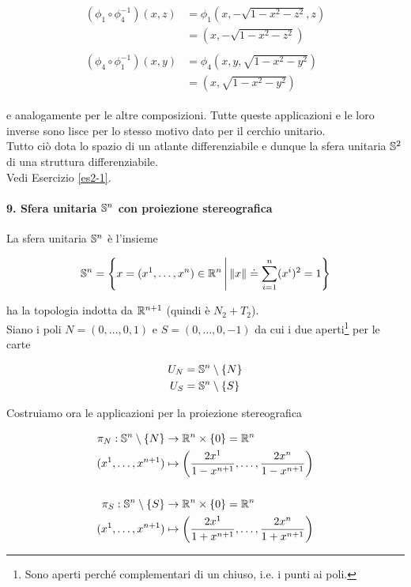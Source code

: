 \begin{align}
	\begin{split}
		(\phi_{1} \circ \phi_{4}^{-1})(x,z) &= \phi_{1} \left( x,-\sqrt{1-x^{2}-z^{2}},z \right)\\
		&= \left( x,-\sqrt{1-x^{2}-z^{2}} \right)\\\\
		(\phi_{4} \circ \phi_{1}^{-1})(x,y) &= \phi_{4} \left( x,y,\sqrt{1-x^{2}-y^{2}} \right)\\
		&= \left( x,\sqrt{1-x^{2}-y^{2}} \right)
	\end{split}
\end{align}

e analogamente per le altre composizioni. Tutte queste applicazioni e le loro inverse sono lisce per lo stesso motivo dato per il cerchio unitario.\\
Tutto ciò dota lo spazio di un atlante differenziabile e dunque la sfera unitaria $ \S^{2} $ di una struttura differenziabile.\\
Vedi Esercizio \ref{es2-1}.

\paragraph{9. Sfera unitaria $ \S^{n} $ con proiezione stereografica}

La sfera unitaria $ \S^{n} $ è l'insieme

\begin{equation}
	\S^{n} = \left\{ x = (x^{1},\dots,x^{n}) \in \R^{n} \, \middle| \, \norm{x} \doteq \sum_{i=1}^{n} (x^{i})^{2} = 1 \right\}
\end{equation}

ha la topologia indotta da $ \R^{n+1} $ (quindi è $ N_{2}+T_{2} $).\\
Siano i poli $ N = (0,\dots,0,1) $ e $ S = (0,\dots,0,-1) $ da cui i due aperti\footnote{%
	Sono aperti perché complementari di un chiuso, i.e. i punti ai poli.%
} per le carte

\begin{align}
	\begin{split}
		U_{N} &= \S^{n} \setminus \{N\}\\
		U_{S} &= \S^{n} \setminus \{S\}
	\end{split}
\end{align}

Costruiamo ora le applicazioni per la proiezione stereografica

\begin{align}
	\begin{split}
		\pi_{N} : \S^{n} \setminus \{N\} &\to \R^{n} \times \{0\} = \R^{n}\\
		(x^{1},\dots,x^{n+1}) &\mapsto \left( \dfrac{2x^{1}}{1-x^{n+1}},\dots,\dfrac{2x^{n}}{1-x^{n+1}} \right)\\\\
		\pi_{S} : \S^{n} \setminus \{S\} &\to \R^{n} \times \{0\} = \R^{n}\\
		(x^{1},\dots,x^{n+1}) &\mapsto \left( \dfrac{2x^{1}}{1+x^{n+1}},\dots,\dfrac{2x^{n}}{1+x^{n+1}} \right)
	\end{split}
\end{align}

